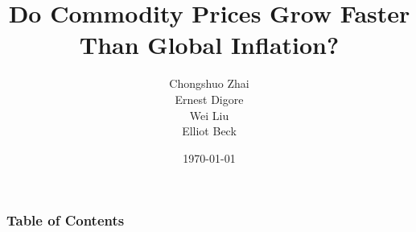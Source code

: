 \documentclass{beamer}
\title{Do Commodity Prices Grow Faster Than Global Inflation?}
\author{Chongshuo Zhai
\\Ernest Digore
\\Wei Liu
\\Elliot Beck}
\institute{IT Skills for Research}
\date{\today}
\begin{document}
\frame{\titlepage}

\begin{frame}
\frametitle{Table of Contents}
\tableofcontents
\end{frame}





% 


% 


% 
\end{document}
